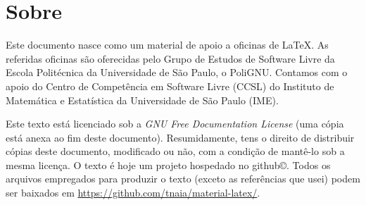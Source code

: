 \section*{Sobre}

Este documento nasce como um material de apoio a oficinas de
\LaTeX. As referidas oficinas são oferecidas pelo Grupo de Estudos de
Software Livre da Escola Politécnica da Universidade de São Paulo, o
PoliGNU. Contamos com o apoio do Centro de Competência em Software Livre (CCSL) do Instituto de Matemática e Estatística da Universidade de São Paulo (IME).

Este texto está licenciado sob a \emph{GNU Free
Documentation License} (uma cópia está anexa ao fim deste documento).
Resumidamente, tens o direito de distribuir cópias deste documento,
modificado ou não, com a condição de mantê-lo sob a mesma licença.
O texto é hoje um projeto hospedado no github\copyright. Todos os
arquivos empregados para produzir o texto (exceto as referências que
usei) podem ser baixados em
\url{https://github.com/tnaia/material-latex/}.
 

\clearpage
